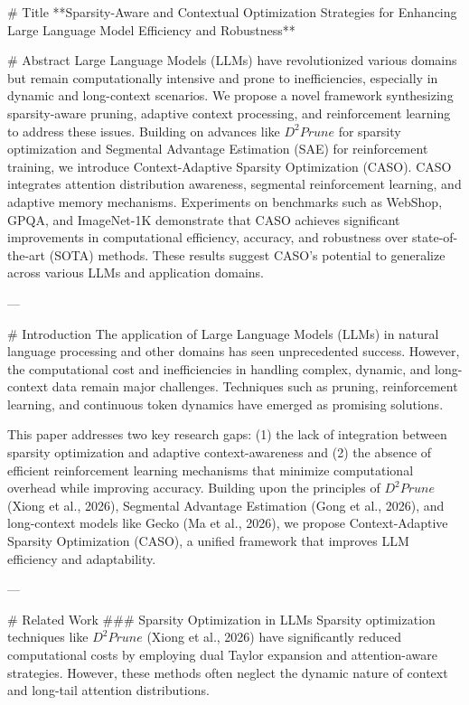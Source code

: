 # Title  
**Sparsity-Aware and Contextual Optimization Strategies for Enhancing Large Language Model Efficiency and Robustness**

# Abstract  
Large Language Models (LLMs) have revolutionized various domains but remain computationally intensive and prone to inefficiencies, especially in dynamic and long-context scenarios. We propose a novel framework synthesizing sparsity-aware pruning, adaptive context processing, and reinforcement learning to address these issues. Building on advances like $D^2Prune$ for sparsity optimization and Segmental Advantage Estimation (SAE) for reinforcement training, we introduce Context-Adaptive Sparsity Optimization (CASO). CASO integrates attention distribution awareness, segmental reinforcement learning, and adaptive memory mechanisms. Experiments on benchmarks such as WebShop, GPQA, and ImageNet-1K demonstrate that CASO achieves significant improvements in computational efficiency, accuracy, and robustness over state-of-the-art (SOTA) methods. These results suggest CASO's potential to generalize across various LLMs and application domains.

---

# Introduction  
The application of Large Language Models (LLMs) in natural language processing and other domains has seen unprecedented success. However, the computational cost and inefficiencies in handling complex, dynamic, and long-context data remain major challenges. Techniques such as pruning, reinforcement learning, and continuous token dynamics have emerged as promising solutions. 

This paper addresses two key research gaps: (1) the lack of integration between sparsity optimization and adaptive context-awareness and (2) the absence of efficient reinforcement learning mechanisms that minimize computational overhead while improving accuracy. Building upon the principles of $D^2Prune$ (Xiong et al., 2026), Segmental Advantage Estimation (Gong et al., 2026), and long-context models like Gecko (Ma et al., 2026), we propose Context-Adaptive Sparsity Optimization (CASO), a unified framework that improves LLM efficiency and adaptability.

---

# Related Work  
### Sparsity Optimization in LLMs  
Sparsity optimization techniques like $D^2Prune$ (Xiong et al., 2026) have significantly reduced computational costs by employing dual Taylor expansion and attention-aware strategies. However, these methods often neglect the dynamic nature of context and long-tail attention distributions.

